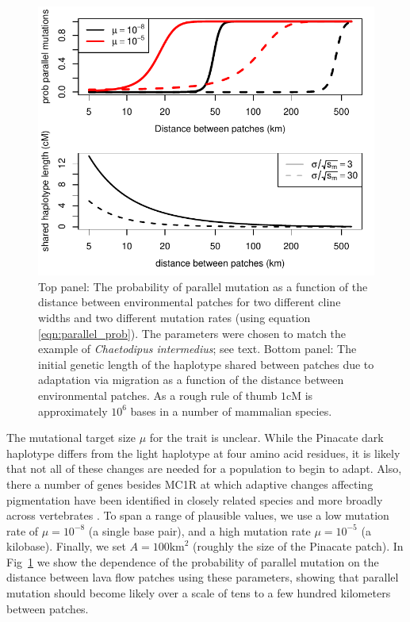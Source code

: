 \documentclass{article}
\newcommand{\citep}[1]{\cite{#1}}
\begin{document}
\begin{figure}[ht]
  \begin{center}
    \includegraphics{Lava_flow_mice_prob_parallel}
  \end{center}
  \caption{
Top panel: The probability of parallel mutation as a function of the distance
between environmental patches for two different cline widths
and two different mutation rates (using equation \eqref{eqn:parallel_prob}). 
The parameters were chosen to match the example of \textit{Chaetodipus intermedius};
see text. Bottom panel: The initial genetic length of the haplotype
shared between patches due to adaptation via migration as a function
of the distance between environmental patches. As a rough rule of
thumb $1$cM is approximately $10^6$ bases in a number of mammalian species. 
  \label{fig:mice_prob_parallel}
  }
\end{figure}

The mutational target size $\mu$ for the trait is unclear. 
While the Pinacate dark haplotype differs from the light haplotype at four amino acid residues,
it is likely that not all of these changes are needed for a population to begin to adapt. 
Also, there a number of genes besides MC1R at which adaptive changes affecting pigmentation 
have been identified in closely related species and more broadly across vertebrates \citep{Hoekstra:06}.
To span a range of plausible values, we use a low mutation rate of $\mu= 10^{-8}$
(a single base pair),
and a high mutation rate $\mu= 10^{-5}$
(a kilobase).
Finally, we set $A=100\text{km}^2$ (roughly the size of the Pinacate
patch). In
Fig~\ref{fig:mice_prob_parallel} we show the dependence of the probability
of parallel mutation on the distance between lava flow patches using these parameters, 
showing that parallel mutation should become
likely over a scale of tens to a few hundred kilometers between patches. 
\end{document}
